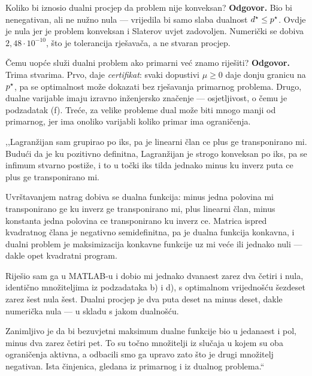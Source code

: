 \begin{pitanje}{Koliko bi iznosio dualni procjep da problem nije konveksan?}
\textbf{Odgovor.} Bio bi nenegativan, ali ne nužno nula --- vrijedila bi samo
slaba dualnost $d^{\star} \leq p^{\star}$. Ovdje je nula jer je problem konveksan i
Slaterov uvjet zadovoljen. Numerički se dobiva $2{,}48 \cdot 10^{-10}$, što je
tolerancija rješavača, a ne stvaran procjep.
\end{pitanje}

\begin{pitanje}{Čemu uopće služi dualni problem ako primarni već znamo riješiti?}
\textbf{Odgovor.} Trima stvarima. Prvo, daje \emph{certifikat}: svaki dopustivi
$\mu \geq 0$ daje donju granicu na $p^{\star}$, pa se optimalnost može dokazati bez
rješavanja primarnog problema. Drugo, dualne varijable imaju izravno inženjersko
značenje --- osjetljivost, o čemu je podzadatak (f). Treće, za velike probleme
dual može biti mnogo manji od primarnog, jer ima onoliko varijabli koliko primar
ima ograničenja.
\end{pitanje}

\begin{izgovor}
,,Lagranžijan sam grupirao po iks, pa je linearni član ce plus ge transponirano
mi. Budući da je ku pozitivno definitna, Lagranžijan je strogo konveksan po iks,
pa se infimum stvarno postiže, i to u točki iks tilda jednako minus ku inverz
puta ce plus ge transponirano mi.

Uvrštavanjem natrag dobiva se dualna funkcija: minus jedna polovina mi
transponirano ge ku inverz ge transponirano mi, plus linearni član, minus
konstanta jedna polovina ce transponirano ku inverz ce. Matrica ispred kvadratnog
člana je negativno semidefinitna, pa je dualna funkcija konkavna, i dualni
problem je maksimizacija konkavne funkcije uz mi veće ili jednako nuli --- dakle
opet kvadratni program.

Riješio sam ga u MATLAB-u i dobio mi jednako dvanaest zarez dva četiri i nula,
identično množiteljima iz podzadataka b) i d), s optimalnom vrijednošću šezdeset
zarez šest nula šest. Dualni procjep je dva puta deset na minus deset, dakle
numerička nula --- u skladu s jakom dualnošću.

Zanimljivo je da bi bezuvjetni maksimum dualne funkcije bio u jedanaest i pol,
minus dva zarez četiri pet. To su točno množitelji iz slučaja u kojem su oba
ograničenja aktivna, a odbacili smo ga upravo zato što je drugi množitelj
negativan. Ista činjenica, gledana iz primarnog i iz dualnog problema.``
\end{izgovor}
